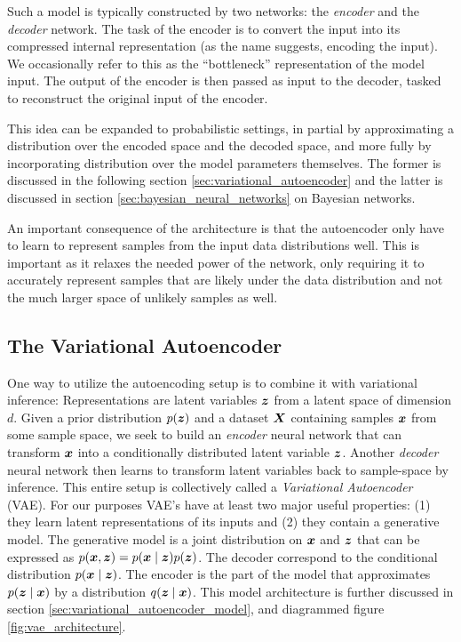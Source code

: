 Such a model is typically constructed by two networks: the \textit{encoder} and the \textit{decoder} network. The task of the encoder is to convert the input into its compressed internal representation (as the name suggests, encoding the input). We occasionally refer to this as the ``bottleneck'' representation of the model input. The output of the encoder is then passed as input to the decoder, tasked to reconstruct the original input of the encoder.

This idea can be expanded to probabilistic settings, in partial by approximating a distribution over the encoded space and the decoded space, and more fully by incorporating distribution over the model parameters themselves. The former is discussed in the following section \ref{sec:variational_autoencoder} and the latter is discussed in section \ref{sec:bayesian_neural_networks} on Bayesian networks.

An important consequence of the architecture is that the autoencoder only have to learn to represent samples from the input data distributions well. This is important as it relaxes the needed power of the network, only requiring it to accurately represent samples that are likely under the data distribution and not the much larger space of unlikely samples as well.

\subsection{The Variational Autoencoder}
One way to utilize the autoencoding setup is to combine it with variational inference: Representations are latent variables $\bm{ z }$ from a latent space of dimension $d$. Given a prior distribution $p{\mathopen{} \left( \bm{ z } \right) \mathclose{}}$ and a dataset $\bm{ X }$ containing samples $\bm{ x }$ from some sample space, we seek to build an \textit{encoder} neural network that can transform $\bm{ x }$ into a conditionally distributed latent variable $\bm{ z }$. Another \textit{decoder} neural network then learns to transform latent variables back to sample-space by inference. This entire setup is collectively called a \textit{Variational Autoencoder} (VAE). For our purposes VAE's have at least two major useful properties: (1) they learn latent representations of its inputs and (2) they contain a generative model. The generative model is a joint distribution on $\bm{ x }$ and $\bm{ z }$ that can be expressed as $p(\bm{ x }, \bm{ z }) = p(\bm{ x } \mid \bm{ z }) p(\bm{ z })$. The decoder correspond to the conditional distribution $p(\bm{ x } \mid \bm{ z })$. The encoder is the part of the model that approximates $p(\bm{ z } \mid \bm{ x })$ by a distribution $q(\bm{ z } \mid \bm{ x })$. This model architecture is further discussed in section \ref{sec:variational_autoencoder_model}, and diagrammed figure \ref{fig:vae_architecture}.

